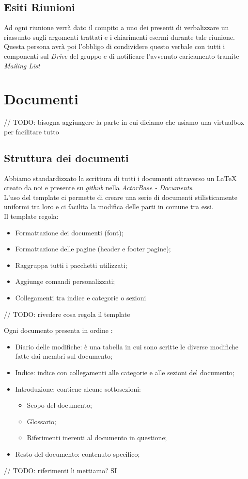 \documentclass{scalatekids-article}
\begin{document}
\subsection{Esiti Riunioni}
Ad ogni riunione verrà dato il compito a uno dei presenti di verbalizzare un riassunto sugli argomenti trattati e i chiarimenti esermi durante tale riunione.\\
Questa persona avrà poi l'obbligo di condividere questo verbale con tutti i componenti sul \textit{Drive} del gruppo e di notificare l'avvenuto caricamento tramite \textit{Mailing List}

\section{Documenti}
	// TODO: bisogna aggiungere la parte in cui diciamo che usiamo una virtualbox per facilitare tutto

\subsection{Struttura dei documenti}
Abbiamo standardizzato la scrittura di tutti i documenti attraverso un  \LaTeX\xspace creato da noi e presente su \textit{github} nella  \textit{ActorBase - Documents}.\\
L'uso del template ci permette di creare una serie di documenti stilisticamente uniformi tra loro e ci facilita la modifica delle parti in comune tra essi.\\
Il template regola:
\begin{itemize}
\item Formattazione dei documenti (font);
\item Formattazione delle pagine (header e footer pagine);
\item Raggruppa tutti i pacchetti utilizzati;
\item Aggiunge comandi personalizzati;
\item Collegamenti tra indice e categorie o sezioni
\end{itemize}
	// TODO: rivedere cosa regola il template

Ogni documento presenta in ordine :
\begin{itemize}
\item Diario delle modifiche: è una tabella in cui sono scritte le diverse modifiche fatte dai membri sul documento;
\item Indice: indice con collegamenti alle categorie e alle sezioni del documento;
\item Introduzione: contiene alcune sottosezioni:
	\begin{itemize}
	\item Scopo del documento;
	\item Glossario;
	\item Riferimenti inerenti al documento in questione;
	\end{itemize}
\item Resto del documento: contenuto specifico;
\end{itemize}
	// TODO: riferimenti li mettiamo? SI
\end{document}
